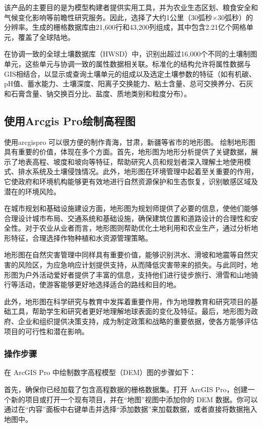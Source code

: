 \documentclass{article}
\begin{document}
	该产品的主要目的是为模型构建者提供实用工具，并为农业生态区划、粮食安全和气候变化影响等前瞻性研究服务。因此，选择了大约1公里（30弧秒×30弧秒）的分辨率。生成的栅格数据库由21,600行和43,200列组成，其中包含2.21亿个网格单元，覆盖了全球陆地。
	
	在协调一致的全球土壤数据库（HWSD）中，识别出超过16,000个不同的土壤制图单元，这些单元与协调一致的属性数据相关联。标准化的结构允许将属性数据与GIS相结合，以显示或查询土壤单元的组成以及选定土壤参数的特征（如有机碳、pH值、蓄水能力、土壤深度、阳离子交换能力、粘土含量、总可交换养分、石灰和石膏含量、钠交换百分比、盐度、质地类别和粒度分布）。
		
	\subsection{使用Arcgis Pro绘制高程图}

使用arcgispro 可以很方便的制作青海，甘肃，新疆等省市的地形图。
绘制地形图具有重要的价值，体现在多个方面。首先，地形图为地形分析提供了关键数据，展示了地表高程、坡度和坡向等特征，帮助研究人员和规划者深入理解土地使用模式、排水系统及土壤侵蚀情况。此外，地形图在环境管理中起着至关重要的作用，它使政府和环境机构能够更有效地进行自然资源保护和生态恢复，识别敏感区域及潜在的环境风险。

在城市规划和基础设施建设方面，地形图为规划师提供了必要的信息，使他们能够合理设计城市布局、交通系统和基础设施，确保建筑位置和道路设计的合理性和安全性。对于农业从业者而言，地形图则帮助优化土地利用和农业生产，通过分析地形特征，合理选择作物种植和水资源管理策略。

地形图在自然灾害管理中同样具有重要价值，能够识别洪水、滑坡和地震等自然灾害的风险区，为应急响应计划提供支持，从而降低灾害带来的损失。与此同时，地形图为户外活动爱好者提供了丰富的信息，支持他们进行徒步旅行、滑雪和山地骑行等活动，使游客能够更好地选择适合的路线和目的地。

此外，地形图在科学研究与教育中发挥着重要作用，作为地理教育和研究项目的基础工具，帮助学生和研究者更好地理解地球表面的变化及特征。最后，地形图为政府、企业和组织提供决策支持，成为制定政策和战略的重要依据，使各方能够评估项目的可行性和潜在影响。

		\subsubsection{操作步骤}
		在 ArcGIS Pro 中绘制数字高程模型（DEM）图的步骤如下：
		
		首先，确保你已经加载了包含高程数据的栅格数据集。打开 ArcGIS Pro，创建一个新的项目或打开一个现有项目，并在“地图”视图中添加你的 DEM 数据。你可以通过在“内容”面板中右键单击并选择“添加数据”来加载数据，或者直接将数据拖入地图中。
		
\end{document}
